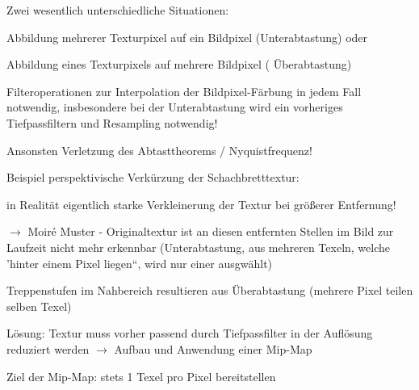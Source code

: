 \documentclass[landscape]{article}
\begin{document}
\begin{multicols}{3}
  Zwei wesentlich unterschiedliche Situationen:
  \begin{itemize*}
    \item Abbildung mehrerer Texturpixel auf ein Bildpixel (Unterabtastung) oder
    \item Abbildung eines Texturpixels auf mehrere Bildpixel ( Überabtastung)
    \item Filteroperationen zur Interpolation der Bildpixel-Färbung in jedem Fall notwendig, insbesondere bei der Unterabtastung wird ein vorheriges Tiefpassfiltern und Resampling notwendig!
    \item Ansonsten Verletzung des Abtasttheorems / Nyquistfrequenz!
  \end{itemize*}
  
  Beispiel perspektivische Verkürzung der Schachbretttextur:
  \begin{itemize*}
    \item in Realität eigentlich starke Verkleinerung der Textur bei größerer Entfernung!
    \item $\rightarrow$ Moiré Muster - Originaltextur ist an diesen entfernten Stellen im Bild zur Laufzeit nicht mehr erkennbar (Unterabtastung, aus mehreren Texeln, welche 'hinter einem Pixel liegen“, wird nur einer ausgwählt)
    \item Treppenstufen im Nahbereich resultieren aus Überabtastung (mehrere Pixel teilen selben Texel)
    \item Lösung: Textur muss vorher passend durch Tiefpassfilter in der Auflösung reduziert werden $\rightarrow$ Aufbau und Anwendung einer Mip-Map
    \item Ziel der Mip-Map: stets 1 Texel pro Pixel bereitstellen
  \end{itemize*}
  
  

\end{multicols}
\end{document}
